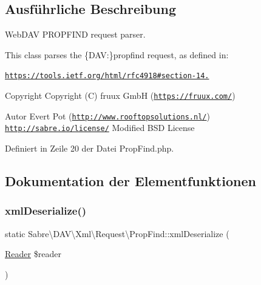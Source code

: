 \subsection{Ausführliche Beschreibung}
Web\+D\+AV P\+R\+O\+P\+F\+I\+ND request parser.

This class parses the \{D\+AV\+:\}propfind request, as defined in\+:

\href{https://tools.ietf.org/html/rfc4918#section-14.20}{\tt https\+://tools.\+ietf.\+org/html/rfc4918\#section-\/14.}

\begin{DoxyCopyright}{Copyright}
Copyright (C) fruux GmbH (\href{https://fruux.com/}{\tt https\+://fruux.\+com/}) 
\end{DoxyCopyright}
\begin{DoxyAuthor}{Autor}
Evert Pot (\href{http://www.rooftopsolutions.nl/}{\tt http\+://www.\+rooftopsolutions.\+nl/})  \href{http://sabre.io/license/}{\tt http\+://sabre.\+io/license/} Modified B\+SD License 
\end{DoxyAuthor}


Definiert in Zeile 20 der Datei Prop\+Find.\+php.



\subsection{Dokumentation der Elementfunktionen}
\mbox{\label{class_sabre_1_1_d_a_v_1_1_xml_1_1_request_1_1_prop_find_aeb20071602160c3cd1988077a0ad09f0}} 
\subsubsection{\texorpdfstring{xml\+Deserialize()}{xmlDeserialize()}}
{\footnotesize\ttfamily static Sabre\textbackslash{}\+D\+A\+V\textbackslash{}\+Xml\textbackslash{}\+Request\textbackslash{}\+Prop\+Find\+::xml\+Deserialize (\begin{DoxyParamCaption}\item[{\mbox{\hyperlink{class_sabre_1_1_xml_1_1_reader}{Reader}}}]{\$reader }\end{DoxyParamCaption})\hspace{0.3cm}{\ttfamily [static]}}

